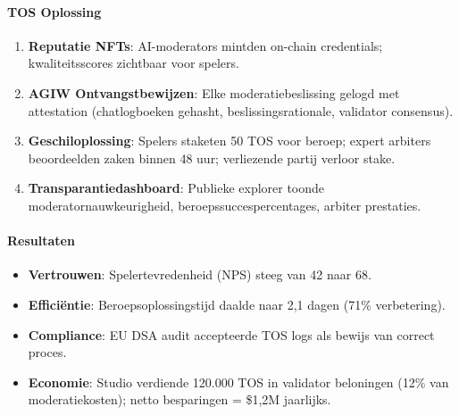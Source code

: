 \documentclass[11pt]{article}
\begin{document}
\paragraph{TOS Oplossing}
\begin{enumerate}[noitemsep]
  \item \textbf{Reputatie NFTs}: AI-moderators mintden on-chain credentials; kwaliteitsscores zichtbaar voor spelers.
  \item \textbf{AGIW Ontvangstbewijzen}: Elke moderatiebeslissing gelogd met attestation (chatlogboeken gehasht, beslissingsrationale, validator consensus).
  \item \textbf{Geschiloplossing}: Spelers staketen 50 TOS voor beroep; expert arbiters beoordeelden zaken binnen 48 uur; verliezende partij verloor stake.
  \item \textbf{Transparantiedashboard}: Publieke explorer toonde moderatornauwkeurigheid, beroepssuccespercentages, arbiter prestaties.
\end{enumerate}

\paragraph{Resultaten}
\begin{itemize}[noitemsep]
  \item \textbf{Vertrouwen}: Spelertevredenheid (NPS) steeg van 42 naar 68.
  \item \textbf{Efficiëntie}: Beroepsoplossingstijd daalde naar 2,1 dagen (71\% verbetering).
  \item \textbf{Compliance}: EU DSA audit accepteerde TOS logs als bewijs van correct proces.
  \item \textbf{Economie}: Studio verdiende 120.000 TOS in validator beloningen (12\% van moderatiekosten); netto besparingen = \$1,2M jaarlijks.
\end{itemize}
\end{document}
